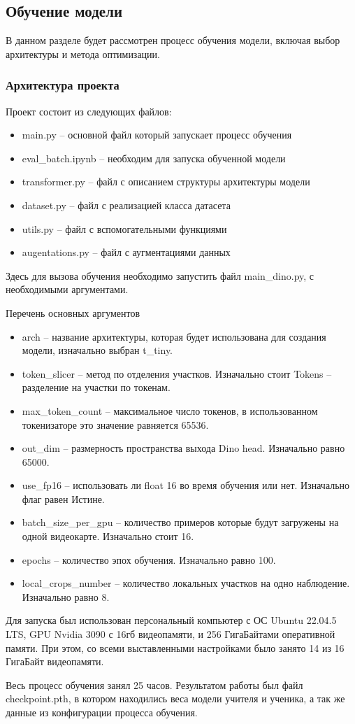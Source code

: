 \documentclass[../part_3.tex]{subfiles}
\begin{document}
\subsection{Обучение модели}
\par В данном разделе будет рассмотрен процесс обучения модели, включая выбор архитектуры и метода оптимизации.
\subsubsection{Архитектура проекта}
\par Проект состоит из следующих файлов:
\begin{itemize}
    \item main.py -- основной файл который запускает процесс обучения
    \item eval\_batch.ipynb -- необходим для запуска обученной модели
    \item transformer.py -- файл с описанием структуры архитектуры модели 
    \item dataset.py -- файл с реализацией класса датасета
    \item utils.py -- файл с вспомогательными функциями
    \item augentations.py -- файл с аугментациями данных
\end{itemize}
\par Здесь для вызова обучения необходимо запустить файл main\_dino.py, с необходимыми аргументами.
\par Перечень основных аргументов
\begin{itemize}
    \item arch -- название архитектуры, которая будет использована для создания модели, изначально выбран t\_tiny.
    \item token\_slicer -- метод по отделения участков. Изначально стоит Tokens -- разделение на участки по токенам.
    \item max\_token\_count -- максимальное число токенов, в использованном токенизаторе это значение равняется 65536.
    \item out\_dim -- размерность пространства выхода Dino head. Изначально равно 65000.
    \item use\_fp16 -- использовать ли float 16 во время обучения или нет. Изначально флаг равен Истине.
    \item batch\_size\_per\_gpu -- количество примеров которые будут загружены на одной видеокарте. Изначально стоит 16.
    \item epochs -- количество эпох обучения. Изначально равно 100.
    \item local\_crops\_number -- количество локальных участков на одно наблюдение. Изначально равно 8.
\end{itemize}
\par Для запуска был использован персональный компьютер с ОС Ubuntu 22.04.5 LTS, GPU Nvidia 3090 с 16гб видеопамяти, и 256 ГигаБайтами оперативной памяти. При этом, со всеми выставленными настройками было занято 14 из 16 ГигаБайт видеопамяти.
\par Весь процесс обучения занял 25 часов. Результатом работы был файл checkpoint.pth, в котором находились веса модели учителя и ученика, а так же данные из конфигурации процесса обучения.
\end{document}
